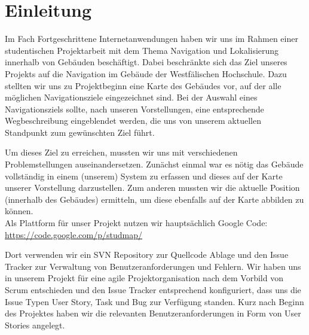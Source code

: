 \chapter{Einleitung}
Im Fach Fortgeschrittene Internetanwendungen haben wir uns im Rahmen einer studentischen Projektarbeit mit dem Thema Navigation und Lokalisierung innerhalb von Gebäuden beschäftigt. Dabei beschränkte sich das Ziel unseres Projekts auf die Navigation im Gebäude der Westfälischen Hochschule. Dazu stellten wir uns zu Projektbeginn eine Karte des Gebäudes vor, auf der alle möglichen Navigationsziele eingezeichnet sind. Bei der Auswahl eines Navigationsziels sollte, nach unseren Vorstellungen, eine entsprechende Wegbeschreibung eingeblendet werden, die uns von unserem aktuellen Standpunkt zum gewünschten Ziel führt.

Um dieses Ziel zu erreichen, mussten wir uns mit verschiedenen Problemstellungen auseinandersetzen. Zunächst einmal war es nötig das Gebäude vollständig in einem (unserem) System zu erfassen und dieses auf der Karte unserer Vorstellung darzustellen. Zum anderen mussten wir die aktuelle Position (innerhalb des Gebäudes) ermitteln, um diese ebenfalls auf der Karte abbilden zu können. \\


Als Plattform für unser Projekt nutzen wir hauptsächlich Google Code:\\
\href{https://code.google.com/p/studmap/}{https://code.google.com/p/studmap/}

Dort verwenden wir ein SVN Repository zur Quellcode Ablage und den Issue Tracker zur Verwaltung von Benutzeranforderungen und Fehlern. Wir haben uns in unserem Projekt für eine agile Projektorganisation nach dem Vorbild von Scrum entschieden und den Issue Tracker entsprechend konfiguriert, dass uns die Issue Typen User Story, Task und Bug zur Verfügung standen. Kurz nach Beginn des Projektes haben wir die relevanten Benutzeranforderungen in Form von User Stories angelegt.




